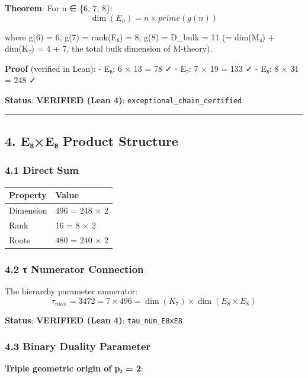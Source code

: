 \documentclass[11pt,a4paper]{article}
\begin{document}
{{{{{{\textbf{Theorem}: For n ∈ \{6, 7, 8\}:
\[\dim(E_n) = n \times prime(g(n))\]

where g(6) = 6, g(7) = rank(E₈) = 8, g(8) = D\_bulk = 11 (= dim(M₄) + dim(K₇) = 4 + 7, the total bulk dimension of M-theory).

\textbf{Proof} (verified in Lean):
- E₆: 6 × 13 = 78 ✓
- E₇: 7 × 19 = 133 ✓
- E₈: 8 × 31 = 248 ✓

\textbf{Status}: \textbf{VERIFIED (Lean 4)}: \texttt{exceptional\_chain\_certified}

\begin{center}\rule{0.5\linewidth}{0.5pt}\end{center}

\subsection{4. E₈×E₈ Product Structure}\label{eux2088eux2088-product-structure}

\subsubsection{4.1 Direct Sum}\label{direct-sum}

{\def\LTcaptype{none} %
\begin{longtable}[]{@{}ll@{}}
\toprule\noalign{}
Property & Value \\
\midrule\noalign{}
\endhead
\bottomrule\noalign{}
\endlastfoot
Dimension & 496 = 248 × 2 \\
Rank & 16 = 8 × 2 \\
Roots & 480 = 240 × 2 \\
\end{longtable}
\subsubsection{4.2 τ Numerator Connection}\label{ux3c4-numerator-connection}

The hierarchy parameter numerator:
\[\tau_{num} = 3472 = 7 \times 496 = \dim(K_7) \times \dim(E_8 \times E_8)\]

\textbf{Status}: \textbf{VERIFIED (Lean 4)}: \texttt{tau\_num\_E8xE8}

\subsubsection{4.3 Binary Duality Parameter}\label{binary-duality-parameter}

\textbf{Triple geometric origin of p₂ = 2}:

}}}}}}}
\end{document}

